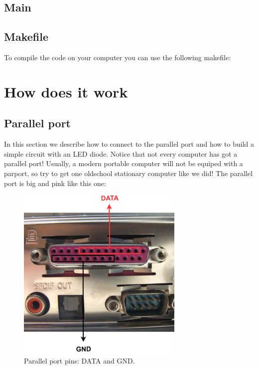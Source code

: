 \documentclass[12pt]{report}
\begin{document}
\subsection{Main}



\subsection{Makefile}

To compile the code on your computer you can use the following makefile:




\section{How does it work}

\newpage

\subsection{Parallel port}

In this section we describe how to connect to the parallel port and how to build a simple circuit with an LED diode. Notice that not every computer has got a parallel port! Usually, a modern portable computer will not be equiped with a parport, so try to get one oldschool stationary computer like we did! The parallel port is big and pink like this one:

\begin{figure}[H]
\centering\includegraphics[width=8cm]{par_port}
\caption{Parallel port pins: DATA and GND.}				
\label{fig:par_port}
\end{figure}
\end{document}
